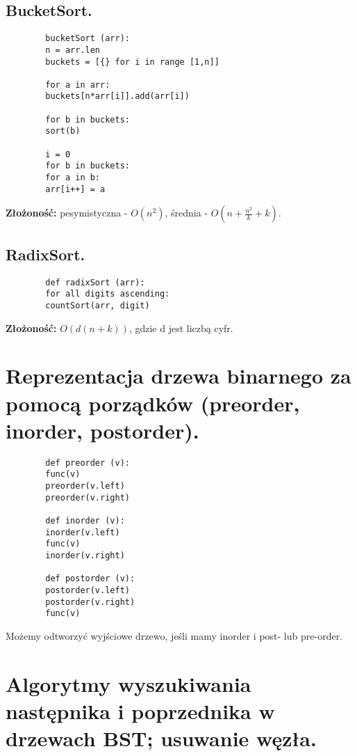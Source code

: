 \documentclass[main.tex]{subfiles}
\begin{document}
    \subsection{BucketSort.}
    \begin{verbatim}
        bucketSort (arr):
        n = arr.len
        buckets = [{} for i in range [1,n]]

        for a in arr:
        buckets[n*arr[i]].add(arr[i])

        for b in buckets:
        sort(b)

        i = 0
        for b in buckets:
        for a in b:
        arr[i++] = a
    \end{verbatim}
    \textbf{Złożoność:} pesymistyczna -  $O(n^2)$, średnia - $O\left(n + \frac{n^2}{k} + k\right)$.

    \subsection{RadixSort.}
    \begin{verbatim}
        def radixSort (arr):
        for all digits ascending:
        countSort(arr, digit)
    \end{verbatim}
    \textbf{Złożoność:} $O(d(n+k))$, gdzie d jest liczbą cyfr.


    \section{Reprezentacja drzewa binarnego za pomocą porządków (preorder, inorder, postorder).}

    \begin{verbatim}
        def preorder (v):
        func(v)
        preorder(v.left)
        preorder(v.right)

        def inorder (v):
        inorder(v.left)
        func(v)
        inorder(v.right)

        def postorder (v):
        postorder(v.left)
        postorder(v.right)
        func(v)
    \end{verbatim}

    Możemy odtworzyć wyjściowe drzewo, jeśli mamy inorder i post- lub pre-order.


    \section{Algorytmy wyszukiwania następnika i poprzednika w drzewach BST; usuwanie węzła.}
\end{document}
